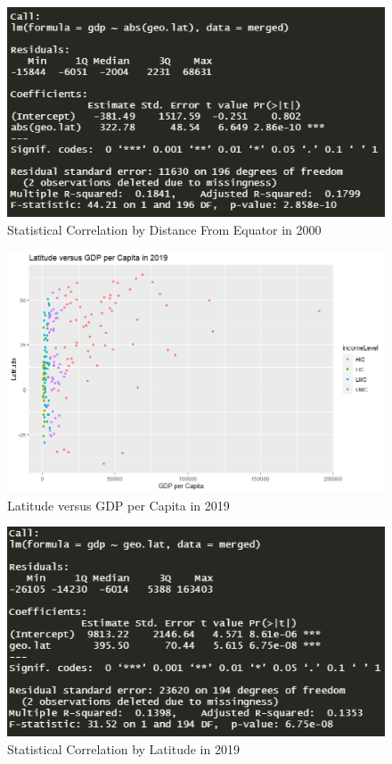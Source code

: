 \documentclass[15pt]{article}
\begin{document}
\begin{figure}[H]
    \centering
    \includegraphics[scale = 0.5]{Part1_dist_from_equator_r^2_2000.PNG}
    \caption{Statistical Correlation by Distance From Equator in 2000}
\end{figure}

\begin{figure}[H]
    \centering
    \includegraphics[scale = 0.5]{Part1_2019.png}
    \caption{Latitude versus GDP per Capita in 2019}
\end{figure}

\begin{figure}[H]
    \centering
    \includegraphics[scale = 0.5]{Part1_latitude_r^2_2019.PNG}
    \caption{Statistical Correlation by Latitude in 2019}
\end{figure}
\end{document}
